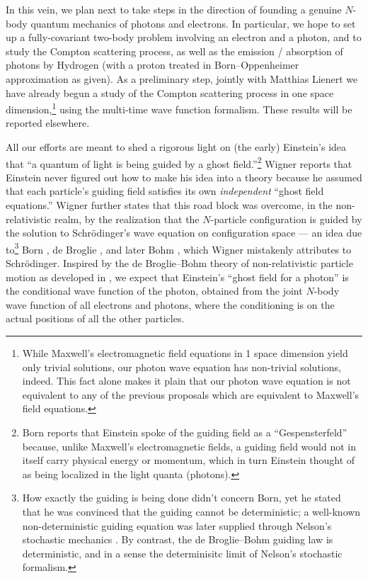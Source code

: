 \documentclass[12pt]{article}
\theoremstyle{definition}
\numberwithin{equation}{section}
\begin{document}
 In this vein, we plan next to take steps in the direction of founding a genuine $N$-body quantum mechanics of 
photons and electrons.
 In particular, we hope to set up a fully-covariant two-body problem involving an electron and a photon, and to study
the Compton scattering process, as well as the emission / absorption of photons by Hydrogen (with a proton treated in 
Born--Oppenheimer approximation as given).
 As a preliminary step, jointly with Matthias Lienert we have already begun a study of the Compton scattering process in 
one space dimension,\footnote{While Maxwell's electromagnetic field equations in 1 space dimension yield only
  trivial solutions, our photon wave equation has non-trivial solutions, indeed.
  This fact alone makes it plain that our photon wave equation is not equivalent to any of the previous proposals which are 
   equivalent to Maxwell's field equations.}
using the multi-time wave function formalism.
  These results will be reported elsewhere.

 All our efforts are meant to shed a rigorous light on (the early) Einstein's idea that ``a quantum of light is being guided by a 
ghost field.''\footnote{Born \cite{BornsPSISQUAREpapersA,BornsPSISQUAREpapersB} reports that Einstein spoke of the guiding
 field as a ``Gespensterfeld'' because, unlike Maxwell's electromagnetic fields, a guiding field would not in itself carry 
 physical energy or momentum, which in turn Einstein thought of as being localized in the light quanta (photons).} 
 Wigner \cite{WignerCollectedWorks} reports that Einstein never figured out how to make his idea into a theory because he 
assumed that each particle's guiding field satisfies its own \emph{independent} ``ghost field equations.'' 
 Wigner further states that this road block was overcome, in the non-relativistic realm, by the realization that the 
$N$-particle configuration is guided by the solution to Schr\"odinger's wave equation on configuration space --- 
an idea due to\footnote{\label{fn:BdBB}How exactly the guiding is being done didn't concern Born, yet he stated that he 
was convinced that the guiding cannot be deterministic; a well-known non-deterministic guiding equation was later supplied 
through Nelson's stochastic mechanics \cite{NelsonA,NelsonB}.
  By contrast, the de Broglie--Bohm guiding law is deterministic, and in a sense the determinisitc limit of Nelson's stochastic 
formalism.}
Born \cite{BornsPSISQUAREpapersA,BornsPSISQUAREpapersB}, de Broglie \cite{deBroglieSOLVAY}, and later Bohm \cite{Bohm52}, 
which Wigner mistakenly attributes to Schr\"odinger. 
 Inspired by the de Broglie--Bohm theory of non-relativistic particle motion as developed in \cite{DGZ}, we expect 
that Einstein's ``ghost field for a photon'' is the conditional wave function of the photon, obtained from
the joint $N$-body wave function of all electrons and photons, where the conditioning is on the actual positions of all the other particles.
 
\end{document}
